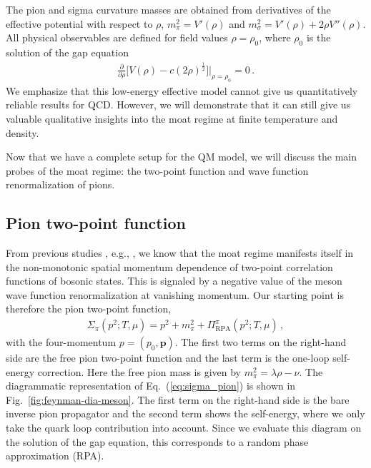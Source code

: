 \documentclass[reprint,english,superscriptaddress,preprintnumbers,amsmath,amssymb,aps,prd]{revtex4-2}
\def\Eq#1{Eq.~(\ref{#1})}
\def\Fig#1{Fig.~\ref{#1}}
\begin{document}
The pion and sigma curvature masses are obtained from derivatives of the effective potential with respect to $\rho$, $m^2_\pi=V'(\rho)$ and $m^2_\sigma=V'(\rho)+2\rho V''(\rho)$. All physical observables are defined for field values $\rho = \rho_0$, where $\rho_0$ is the solution of the gap equation
%
\begin{align}
\frac{\partial}{\partial\rho}\Big[V(\rho)-c(2\rho)^\frac{1}{2}\Big]\bigg|_{\rho=\rho_0}=0\,.\label{eq:eom}
\end{align}
%
We emphasize that this low-energy effective model cannot give us quantitatively reliable results for QCD. However, we will demonstrate that it can still give us valuable qualitative insights into the moat regime at finite temperature and density.

Now that we have a complete setup for the QM model, we will discuss the main probes of the moat regime: the two-point function and wave function renormalization of pions.

\subsection{Pion two-point function}\label{sec:pion_prop}
%

From previous studies , e.g., \cite{Fu:2019hdw,Pisarski:2021qof,Koenigstein:2021llr, Rennecke:2023xhc, Pannullo:2024sov, Fu:2024rto, Topfel:2024iop, Cao:2025zvh, Motta:2025xop}, we know that the moat regime manifests itself in the non-monotonic spatial momentum dependence of two-point correlation functions of bosonic states. This is signaled by a negative value of the meson wave function renormalization at vanishing momentum. Our starting point is therefore the pion two-point function,
%
\begin{align}\label{eq:sigma_pion}
\Sigma_\pi(p^2;T,\mu)=p^2+m^2_\pi+\Pi^\pi_{\mathrm{RPA}}(p^2;T,\mu)\,,
\end{align}
%
with the four-momentum $p=(p_0,\boldsymbol{p})$.
The first two terms on the right-hand side are the free pion two-point function and the last term is the one-loop self-energy correction. Here the free pion mass is given by $m^2_\pi=\lambda\rho-\nu$. The diagrammatic representation of \Eq{eq:sigma_pion} is shown in \Fig{fig:feynman-dia-meson}. The first term on the right-hand side is the bare inverse pion propagator and the second term shows the self-energy, where we only take the quark loop contribution into account. Since we evaluate this diagram on the solution of the gap equation, this corresponds to a random phase approximation (RPA).
\end{document}
